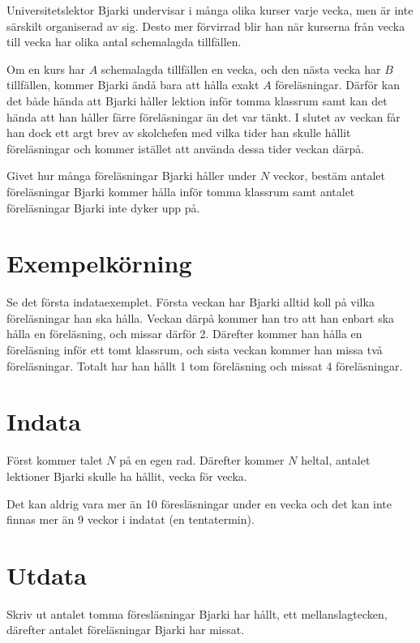 
Universitetslektor Bjarki undervisar i många olika kurser varje vecka, men är
inte särskilt organiserad av sig. Desto mer förvirrad blir han när kurserna
från vecka till vecka har olika antal schemalagda tillfällen.

Om en kurs har $A$ schemalagda tillfällen en vecka, och den nästa vecka har $B$
tillfällen, kommer Bjarki ändå bara att hålla exakt $A$ föreläsningar. Därför
kan det både hända att Bjarki håller lektion inför tomma klassrum samt kan det hända
att han håller färre föreläsningar än det var tänkt. I slutet av veckan
får han dock ett argt brev av skolchefen med vilka tider han skulle hållit
föreläsningar och kommer istället att använda dessa tider veckan därpå.

Givet hur många föreläsningar Bjarki håller under $N$ veckor, bestäm antalet
föreläsningar Bjarki kommer hålla inför tomma klassrum samt antalet
föreläsningar Bjarki inte dyker upp på.

\section*{Exempelkörning}

Se det första indataexemplet. Första veckan har Bjarki alltid koll på vilka
föreläsningar han ska hålla. Veckan därpå kommer han tro att han enbart ska
hålla en föreläsning, och missar därför 2. Därefter kommer han hålla en
föreläsning inför ett tomt klassrum, och sista veckan kommer han missa två
föreläsningar. Totalt har han hållt 1 tom föreläsning och missat 4
föreläsningar.

\section*{Indata}

Först kommer talet $N$ på en egen rad. Därefter kommer $N$ heltal, antalet
lektioner Bjarki skulle ha hållit, vecka för vecka.

Det kan aldrig vara mer än 10 föresläsningar under en vecka och det kan inte
finnas mer än 9 veckor i indatat (en tentatermin).

\section*{Utdata}
Skriv ut antalet tomma föresläsningar Bjarki har hållt, ett mellanslagtecken,
därefter antalet föreläsningar Bjarki har missat.
